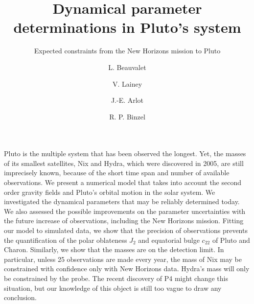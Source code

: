 \documentclass[traditabstract]{aa}
\begin{document}
\title{Dynamical parameter determinations in Pluto's system}
\subtitle{Expected constraints from the New Horizons mission to Pluto}

\author{L. Beauvalet
\and V. Lainey 
\and J.-E. Arlot
\and R. P. Binzel\fnmsep{}
}


\abstract
{
Pluto is the multiple system that has been observed the longest. Yet, the masses of its smallest satellites, Nix and Hydra, which were discovered in 2005, are still imprecisely known, because of the short time span and number of available observations. We present a numerical model that takes into account the second order gravity fields and Pluto's orbital motion in the solar system. We investigated the dynamical parameters that may be reliably determined today. We also assessed the possible improvements on the parameter uncertainties with the future increase of observations, including the New Horizons mission. Fitting our model to simulated data, we show that the precision of observations prevents the quantification of the polar oblateness $J_2$ and equatorial bulge $c_{22}$ of Pluto and Charon. Similarly, we show that the masses are on the detection limit.  In particular, unless 25 observations are made every year, the mass of Nix may be constrained with confidence only with New Horizons data. Hydra's mass will only be constrained by the probe. The recent discovery of P4 might change this situation, but our knowledge of this object is still too vague to draw any conclusion.
}


   \maketitle
\end{document}
